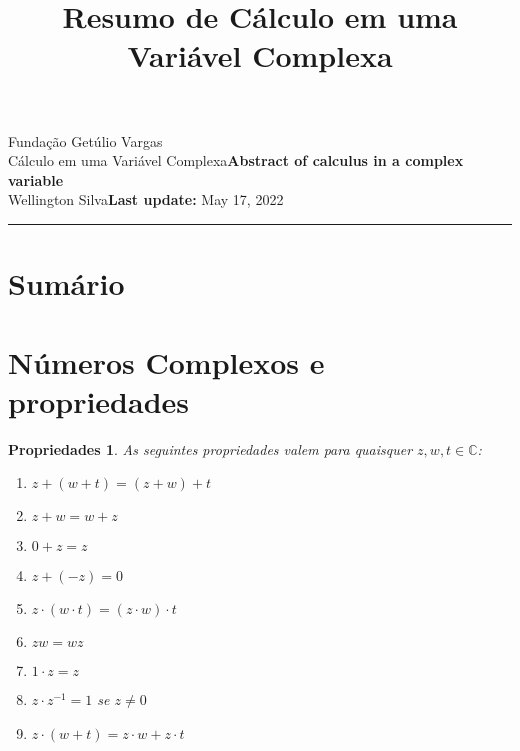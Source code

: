 \documentclass{article}
\title{Resumo de Cálculo em uma Variável Complexa}
\author{}
\date{}
\newtheorem{prop}{Propriedades}
\newcommand{\assignment}{Abstract of calculus in a complex variable}
\newcommand{\duedate}{May 17, 2022}
\begin{document}
Fundação Getúlio Vargas\hfill\\
Cálculo em uma Variável Complexa\hfill\textbf{\assignment}\\
Wellington Silva\hfill\textbf{Last update:} \duedate\\
\smallskip\hrule\bigskip

{\let\newpage\relax\maketitle}

\section*{Sumário}

\textbf{}
\vspace{4.0mm}

\textbf{}
\vspace{4.0mm}

\textbf{}
\vspace{4.0mm}

\textbf{}
\vspace{4.0mm}

\textbf{}
\vspace{4.0mm}

\textbf{}
\vspace{4.0mm}

\textbf{}
\vspace{4.0mm}

\textbf{}
\vspace{4.0mm}

\textbf{}
\vspace{4.0mm}

\newpage

\section*{Números Complexos e propriedades}
\label{s1}

\begin{prop} As seguintes propriedades valem para quaisquer $z, w, t \in \mathbb{C}$:

\begin{enumerate}[label=(\alph*)]
    \item $z + (w + t) = (z + w) + t$
    \item $z + w = w + z$
    \item $0 + z = z$
    \item $z + (-z) = 0$
    \item $z \cdot (w \cdot t) = (z \cdot w) \cdot t$
    \item $zw = wz$
    \item $1 \cdot z = z$
    \item $z \cdot z^{-1} = 1$ se $z \neq 0$
    \item $z \cdot (w + t) = z \cdot w + z \cdot t$
\end{enumerate}
\end{prop}
\end{document}

